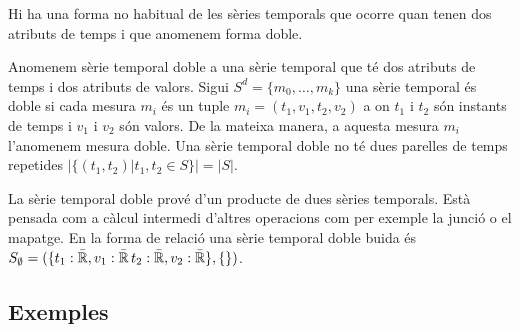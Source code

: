   



Hi ha una forma no habitual de les sèries temporals que ocorre quan
tenen dos atributs de temps i que anomenem forma doble.

\begin{definition}
  \label{def:sgst:st-doble}
  Anomenem sèrie temporal doble a una sèrie temporal que té dos
  atributs de temps i dos atributs de valors. Sigui $S^d =\{m_0,
  \dotsc, m_k\}$ una sèrie temporal és doble si cada mesura $m_i$ és
  un tuple $m_i=(t_1,v_1,t_2,v_2)$ a on $t_1$ i $t_2$ són instants de
  temps i $v_1$ i $v_2$ són valors. De la mateixa manera, a aquesta
  mesura $m_i$ l'anomenem mesura doble.  Una sèrie temporal doble no
  té dues parelles de temps repetides $|\{(t_1,t_2) | t_1,t_2\in S\}|
  = |S|$.
\end{definition}

La sèrie temporal doble prové d'un producte de dues sèries
temporals. Està pensada com a càlcul intermedi d'altres operacions com
per exemple la junció o el mapatge. En la forma de relació una sèrie
temporal doble buida és $S_{\emptyset} = ( \{t_1: \bar{\mathbb{R}{}}, v_1:
\bar{\mathbb{R}{}}\, t_2: \bar{\mathbb{R}{}}, v_2: \bar{\mathbb{R}{}}\}, \{ \} )$.









\subsection{Exemples}



